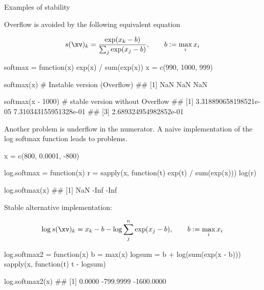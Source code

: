 \begin{vbframe}{Examples of stability}
\col
\normalsize

\framebreak
Overflow is avoided by the following equivalent equation

$$
s(\xv)_k = \frac{\exp(x_k - b)}{\sum_j \exp(x_j - b)}, \qquad b := \max_i x_i
$$

\lz
\footnotesize
\begin{verbbox}
softmax = function(x) exp(x) / sum(exp(x))
x = c(990, 1000, 999)
\end{verbbox}
\col
\vspace{0.1cm}

\begin{verbbox}
softmax(x) # Instable version (Overflow)
## [1] NaN NaN NaN
\end{verbbox}
\col
\vspace{0.1cm}

\begin{verbbox}
softmax(x - 1000) # stable version without Overflow
## [1] 3.318890658198521e-05 7.310343155951328e-01
## [3] 2.689324954982852e-01
\end{verbbox}
\col
\normalsize

\framebreak

Another problem is underflow in the numerator. A naive implementation of the log softmax function leads to problems.
\lz
\lz
\footnotesize
\begin{verbbox}
x = c(800, 0.0001, -800)

log.softmax = function(x) {
  r = sapply(x, function(t) exp(t) / sum(exp(x)))
  log(r)
}

log.softmax(x)
## [1] NaN -Inf -Inf
\end{verbbox}
\col
\normalsize
\framebreak
Stable alternative implementation:

$$
\log s(\xv)_k = x_k - b - \log \sum_j^n \exp(x_j - b), \qquad b := \max_i x_i
$$
\lz
\footnotesize
\begin{verbbox}
log.softmax2 = function(x) {
  b = max(x)
  logsum = b + log(sum(exp(x - b)))
  sapply(x, function(t) t - logsum)
}

log.softmax2(x)
## [1] 0.0000 -799.9999 -1600.0000
\end{verbbox}
\col
\normalsize

%


\end{vbframe}

